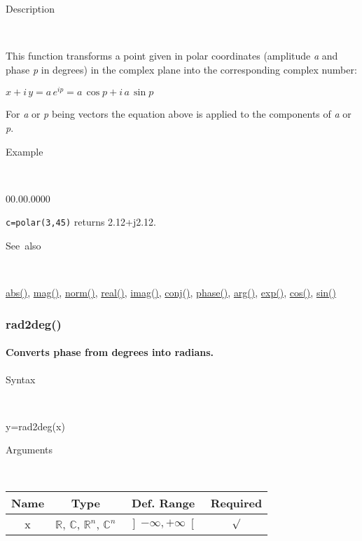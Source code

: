 \begin{description}
\item [Description]~
\end{description}
This function transforms a point given in polar coordinates (amplitude
\textit{a} and phase \textit{p} in degrees) in the complex plane into
the corresponding complex number:

\medskip{}
$x+i\, y=a\, e^{ip}=a\,\cos p+i\, a\,\sin p$
\medskip{}

\noindent For \textit{a} or \textit{p} being vectors the equation
above is applied to the components of \textit{a} or \textit{p}.

\begin{description}
\item [Example]~
\end{description}
\begin{lyxlist}{00.00.0000}
\item [\texttt{c=polar(3,45)}]returns 2.12+j2.12.
\end{lyxlist}
\begin{description}
\item [See~also]~
\end{description}
\textcolor{blue}{\hyperlink{abs}{abs()}}, \textcolor{blue}{\hyperlink{mag}{mag()}},
\textcolor{blue}{\hyperlink{norm}{norm()}}, \textcolor{blue}{\hyperlink{real}{real()}},
\textcolor{blue}{\hyperlink{imag}{imag()}}, \textcolor{blue}{\hyperlink{conj}{conj()}},
\textcolor{blue}{\hyperlink{phase}{phase()}}, \textcolor{blue}{\hyperlink{arg}{arg()}},
\textcolor{blue}{\hyperlink{exp}{exp()}}, \textcolor{blue}{\hyperlink{cos}{cos()}},
\textcolor{blue}{\hyperlink{sin}{sin()}}


\newpage
\subsubsection*{\hypertarget{rad2deg}{}{\Large rad2deg()}}


\paragraph{\label{par:rad2deg}Converts phase from degrees into radians.}

\begin{description}
\item [Syntax]~
\end{description}
y=rad2deg(x)

\begin{description}
\item [Arguments]~
\end{description}
\begin{tabular}{|c|c|c|c|}
\hline 
Name&
Type&
Def. Range&
Required\tabularnewline
\hline
\hline 
x&
$\mathbb{R}$, $\mathbb{C}$, $\mathbb{R}^{n}$, $\mathbb{C}^{n}$ &
$\left]-\infty,+\infty\right[$&
$\surd$\tabularnewline
\hline
\end{tabular}

